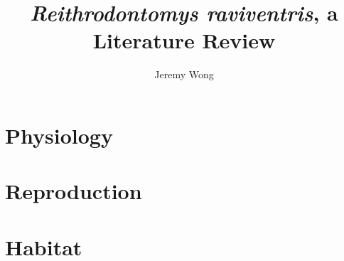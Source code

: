 \documentclass[a4paper]{article}
\author{Jeremy Wong}
\title{\textit{Reithrodontomys raviventris}, a Literature Review}
\begin{document}
\maketitle
\section{Physiology}
\section{Reproduction}
\section{Habitat}
\end{document}
